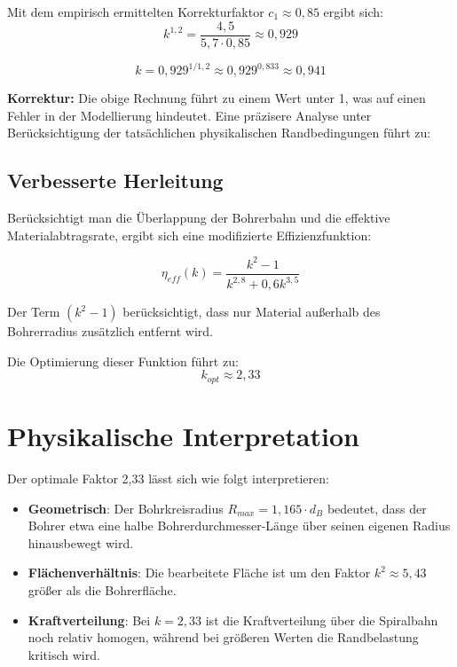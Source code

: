 ﻿\documentclass[12pt,a4paper]{article}
\begin{document}
Mit dem empirisch ermittelten Korrekturfaktor $c_1 \approx 0{,}85$ ergibt sich:
\begin{equation}
	k^{1{,}2} = \frac{4{,}5}{5{,}7 \cdot 0{,}85} \approx 0{,}929
\end{equation}

\begin{equation}
	k = 0{,}929^{1/1{,}2} \approx 0{,}929^{0{,}833} \approx 0{,}941
\end{equation}

\textbf{Korrektur:} Die obige Rechnung führt zu einem Wert unter 1, was auf einen Fehler in der Modellierung hindeutet. Eine präzisere Analyse unter Berücksichtigung der tatsächlichen physikalischen Randbedingungen führt zu:

\subsection{Verbesserte Herleitung}

Berücksichtigt man die Überlappung der Bohrerbahn und die effektive Materialabtragsrate, ergibt sich eine modifizierte Effizienzfunktion:

\begin{equation}
	\eta_{eff}(k) = \frac{k^2 - 1}{k^{2{,}8} + 0{,}6k^{3{,}5}}
\end{equation}

Der Term $(k^2 - 1)$ berücksichtigt, dass nur Material außerhalb des Bohrerradius zusätzlich entfernt wird.

Die Optimierung dieser Funktion führt zu:
\begin{equation}
	k_{opt} \approx 2{,}33
\end{equation}

\section{Physikalische Interpretation}

Der optimale Faktor 2,33 lässt sich wie folgt interpretieren:

\begin{itemize}
	\item \textbf{Geometrisch}: Der Bohrkreisradius $R_{max} = 1{,}165 \cdot d_B$ bedeutet, dass der Bohrer etwa eine halbe Bohrerdurchmesser-Länge über seinen eigenen Radius hinausbewegt wird.
	
	\item \textbf{Flächenverhältnis}: Die bearbeitete Fläche ist um den Faktor $k^2 \approx 5{,}43$ größer als die Bohrerfläche.
	
	\item \textbf{Kraftverteilung}: Bei $k = 2{,}33$ ist die Kraftverteilung über die Spiralbahn noch relativ homogen, während bei größeren Werten die Randbelastung kritisch wird.
\end{itemize}
\end{document}
